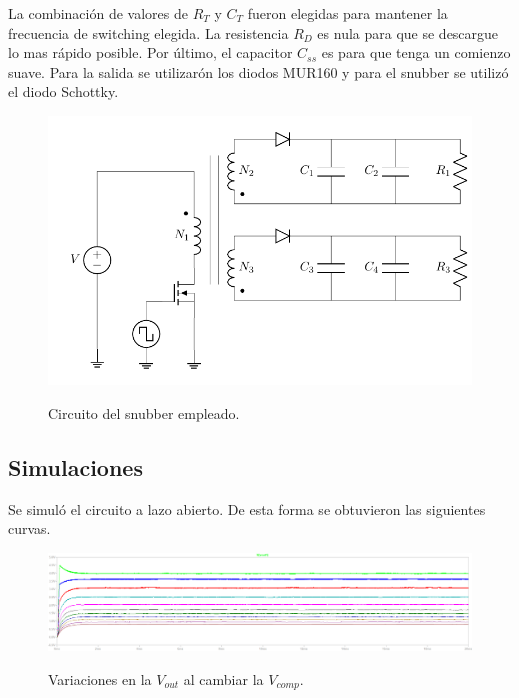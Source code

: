 La combinación de valores de $R_T$ y $C_T$ fueron elegidas para mantener la frecuencia de switching elegida. La resistencia $R_D$ es nula para que se descargue lo mas rápido posible. Por último, el capacitor $C_{ss}$ es para que tenga un comienzo suave.
Para la salida se utilizarón los diodos MUR160 y para el snubber se utilizó el diodo Schottky.  
\begin{figure}[H]
	\centering
	\includegraphics[width=0.7\linewidth, page = 1]{ImagenesParteII/Flyback.pdf}
	\label{fig:fly}
	\caption{Circuito del snubber empleado.}
\end{figure}

\subsection{Simulaciones}


Se simuló el circuito a lazo abierto. De esta forma se obtuvieron las siguientes curvas.
\begin{figure}[H]
	\centering
	\includegraphics[width=0.9\linewidth]{ImagenesParteII/vos.png}
	\label{fig:vos}
	\caption{Variaciones en la $V_{out}$ al cambiar la $V_{comp}$.}
\end{figure}

